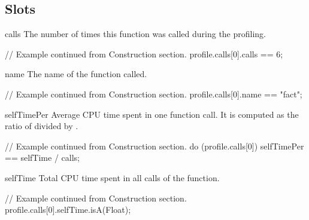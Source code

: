\subsection{Slots}

\begin{urbiscriptapi}
\item[calls]%
  The number of times this function was called during the profiling.
\begin{urbiassert}
// Example continued from Construction section.
profile.calls[0].calls == 6;
\end{urbiassert}

\item[name]%
  The name of the function called.
\begin{urbiassert}
// Example continued from Construction section.
profile.calls[0].name == "fact";
\end{urbiassert}

\item[selfTimePer]%
  Average CPU time spent in one function call. It is computed as the ratio
  of  divided by .
\begin{urbiassert}
// Example continued from Construction section.
do (profile.calls[0])
{
  selfTimePer == selfTime / calls;
}
\end{urbiassert}

\item[selfTime]%
  Total CPU time spent in all calls of the function.
\begin{urbiassert}
// Example continued from Construction section.
profile.calls[0].selfTime.isA(Float);
\end{urbiassert}

\end{urbiscriptapi}


